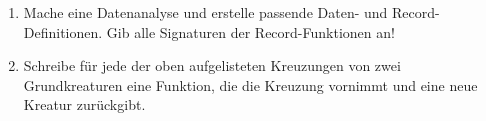 \begin{aufgabe}
  \begin{enumerate}

  \item Mache eine Datenanalyse und erstelle
    passende Daten- und Record-Definitionen.  Gib alle
    Signaturen der Record-Funktionen an!

  \item Schreibe für jede der oben aufgelisteten
    Kreuzungen von zwei Grundkreaturen eine Funktion, die die Kreuzung
    vornimmt und eine neue Kreatur zurückgibt.
  \end{enumerate}
\end{aufgabe}


